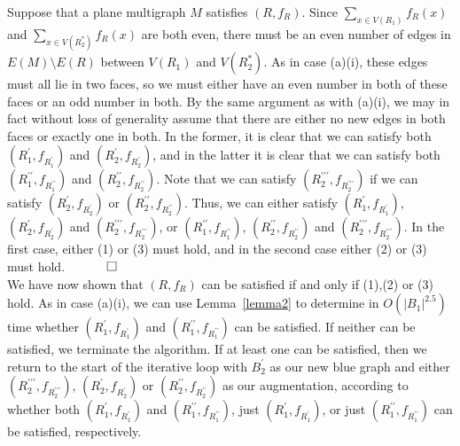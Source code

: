 \documentclass{article}
\newtheorem{Proof of Theorem}{Proof of Theorem}
\begin{document}
Suppose that a plane multigraph $M$ satisfies $(R,f_{R})$.
Since $\sum_{x \in V(R_{1})} f_{R}(x)$ and $\sum_{x \in V \left( R_{2}^{*} \right)} f_{R}(x)$ are both even,
there must be an even number of edges in $E(M) \setminus E(R)$ between $V(R_{1})$ and $V(R_{2}^{*})$.
As in case (a)(i),
these edges must all lie in two faces,
so we must either have an even number in both of these faces or an odd number in both.
By the same argument as with (a)(i),
we may in fact without loss of generality assume that 
there are either no new edges in both faces or exactly one in both.
In the former,
it is clear that we can satisfy both 
$\left( R_{1}^{\prime},f_{R_{1}^{\prime}} \right)$ and $\left( R_{2}^{\prime},f_{R_{2}^{\prime}} \right)$,
and in the latter it is clear that we can satisfy both 
$\left( R_{1}^{\prime\prime},f_{R_{1}^{\prime\prime}} \right)$ 
and $\left( R_{2}^{\prime\prime},f_{R_{2}^{\prime\prime}} \right)$.
Note that we can satisfy $\left( R_{2}^{\prime\prime\prime},f_{R_{2}^{\prime\prime\prime}} \right)$ if 
we can satisfy 
$\left( R_{2}^{\prime},f_{R_{2}^{\prime}} \right)$ or $\left( R_{2}^{\prime\prime},f_{R_{2}^{\prime\prime}} \right)$.
Thus, we can either satisfy 
$\left( R_{1}^{\prime},f_{R_{1}^{\prime}} \right)$,$\left( R_{2}^{\prime},f_{R_{2}^{\prime}} \right)$
and $\left( R_{2}^{\prime\prime\prime},f_{R_{2}^{\prime\prime\prime}} \right)$,
or $\left( R_{1}^{\prime\prime},f_{R_{1}^{\prime\prime}} \right)$,
$\left( R_{2}^{\prime\prime},f_{R_{2}^{\prime\prime}} \right)$ 
and $\left( R_{2}^{\prime\prime\prime},f_{R_{2}^{\prime\prime\prime}} \right)$.
In the first case, either (1) or (3) must hold,
and in the second case either (2) or (3) must hold.
$\phantom{qwerty}
\setlength{\unitlength}{.25cm}
\begin{picture}(1,1)
\put(0,0){\line(1,0){1}}
\put(0,0){\line(0,1){1}}
\put(1,1){\line(-1,0){1}}
\put(1,1){\line(0,-1){1}}
\end{picture}$ \\





We have now shown that $(R,f_{R})$ can be satisfied if and only if (1),(2) or (3) hold.
As in case (a)(i),
we can use Lemma~\ref{lemma2} to determine in $O \left( |B_{1}|^{2.5} \right)$ time whether 
$\left( R_{1}^{\prime},f_{R_{1}^{\prime}} \right)$ and $\left( R_{1}^{\prime\prime},f_{R_{1}^{\prime\prime}} \right)$ 
can be satisfied.
If neither can be satisfied,
we terminate the algorithm.
If at least one can be satisfied,
then we return to the start of the iterative loop with $B_{2}^{\prime}$ as our new blue graph 
and either 
$(R_{2}^{\prime\prime\prime},f_{R_{2}^{\prime\prime\prime}})$,
$(R_{2}^{\prime},f_{R_{2}^{\prime}})$ or $(R_{2}^{\prime\prime},f_{R_{2}^{\prime\prime}})$
as our augmentation,
according to whether both
$\left( R_{1}^{\prime},f_{R_{1}^{\prime}} \right)$ and $\left( R_{1}^{\prime\prime},f_{R_{1}^{\prime\prime}} \right)$,
just $\left( R_{1}^{\prime},f_{R_{1}^{\prime}} \right)$,
or just $\left( R_{1}^{\prime\prime},f_{R_{1}^{\prime\prime}} \right)$
can be satisfied, respectively.
\end{document}
